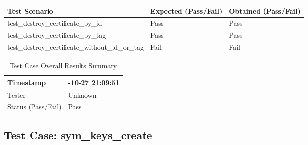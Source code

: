 \documentclass[a4paper,12pt]{article}
\begin{document}
\begin{table}[h]
    \centering
    \begin{tabularx}{1\textwidth}{ 
      | >{\raggedright\arraybackslash}X   
      | p{2.5cm}                            
      | p{2.5cm} |}                         
        \hline
        \textbf{Test Scenario} & \textbf{Expected (Pass/Fail)} & \textbf{Obtained (Pass/Fail)} \\  
        \hline

test\_destroy\_certificate\_by\_id & Pass & Pass \\
\hline

test\_destroy\_certificate\_by\_tag & Pass & Pass \\
\hline

test\_destroy\_certificate\_without\_id\_or\_tag & Fail & Fail \\
\hline

    \end{tabularx}
\end{table}

    \begin{table}[h]
        \centering
        \begin{tabularx}{1\textwidth}{ 
          | >{\raggedright\arraybackslash}X 
          | >{\raggedright\arraybackslash}X | }
            \hline
            Timestamp & 2024-10-27 21:09:51 \\
            \hline
            Tester & Unknown \\
            \hline
            \rowcolor{green!30} %
            Status (Pass/Fail) & Pass \\
            \hline
        \end{tabularx}
        \caption{Test Case Overall Results Summary}
        \label{tab:test_case_info}
    \end{table}

    \newpage
    
\subsection{Test Case: sym\_keys\_create}
\end{document}
